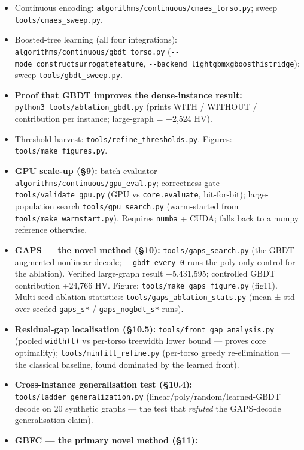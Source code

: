 \documentclass[
  11pt,
]{article}
\providecommand{\tightlist}{%
  \setlength{\itemsep}{0pt}\setlength{\parskip}{0pt}}
\begin{document}
\begin{itemize}
\tightlist
\item
  Continuous encoding: \texttt{algorithms/continuous/cmaes\_torso.py};
  sweep \texttt{tools/cmaes\_sweep.py}.
\item
  Boosted-tree learning (all four integrations):
  \texttt{algorithms/continuous/gbdt\_torso.py}
  (\texttt{-\/-mode\ construct\textbar{}surrogate\textbar{}feature},
  \texttt{-\/-backend\ lightgbm\textbar{}xgboost\textbar{}hist\textbar{}ridge});
  sweep \texttt{tools/gbdt\_sweep.py}.
\item
  \textbf{Proof that GBDT improves the dense-instance result:}
  \texttt{python3\ tools/ablation\_gbdt.py} (prints WITH / WITHOUT /
  contribution per instance; large-graph = +2,524 HV).
\item
  Threshold harvest: \texttt{tools/refine\_thresholds.py}. Figures:
  \texttt{tools/make\_figures.py}.
\item
  \textbf{GPU scale-up (§9):} batch evaluator
  \texttt{algorithms/continuous/gpu\_eval.py}; correctness gate
  \texttt{tools/validate\_gpu.py} (GPU vs \texttt{core.evaluate},
  bit-for-bit); large-population search \texttt{tools/gpu\_search.py}
  (warm-started from \texttt{tools/make\_warmstart.py}). Requires
  \texttt{numba} + CUDA; falls back to a numpy reference otherwise.
\item
  \textbf{GAPS --- the novel method (§10):}
  \texttt{tools/gaps\_search.py} (the GBDT-augmented nonlinear decode;
  \texttt{-\/-gbdt-every\ 0} runs the poly-only control for the
  ablation). Verified large-graph result −5,431,595; controlled GBDT
  contribution +24,766 HV. Figure: \texttt{tools/make\_gaps\_figure.py}
  (fig11). Multi-seed ablation statistics:
  \texttt{tools/gaps\_ablation\_stats.py} (mean ± std over seeded
  \texttt{gaps\_s*} / \texttt{gaps\_nogbdt\_s*} runs).
\item
  \textbf{Residual-gap localisation (§10.5):}
  \texttt{tools/front\_gap\_analysis.py} (pooled \texttt{width(t)} vs
  per-torso treewidth lower bound --- proves core optimality);
  \texttt{tools/minfill\_refine.py} (per-torso greedy re-elimination ---
  the classical baseline, found dominated by the learned front).
\item
  \textbf{Cross-instance generalisation test (§10.4):}
  \texttt{tools/ladder\_generalization.py}
  (linear/poly/random/learned-GBDT decode on 20 synthetic graphs --- the
  test that \emph{refuted} the GAPS-decode generalisation claim).
\item
  \textbf{GBFC --- the primary novel method (§11):}

\end{itemize}
\end{document}
